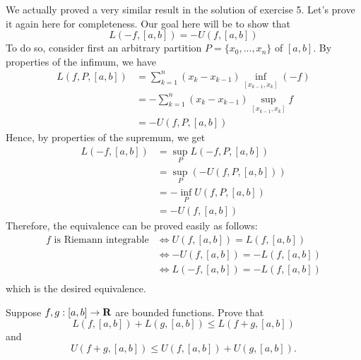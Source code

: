 \begin{solution}
    We actually proved a very similar result in the solution of exercise 5. Let's prove it again here for completeness. Our goal here will be to show that
    $$L(-f, [a,b]) = -U(f, [a,b])$$
    To do so, consider first an arbitrary partition $P = \{x_0, ..., x_n\}$ of $[a,b]$. By properties of the infimum, we have
    \begin{align*}
        L(f, P, [a,b]) &= \sum_{k=1}^{n}(x_k - x_{k-1})\inf_{[x_{k-1}, x_k]}(-f) \\
        &= -\sum_{k=1}^{n}(x_k - x_{k-1})\sup_{[x_{k-1}, x_k]}f \\
        &=-U(f, P, [a,b])
    \end{align*}
    Hence, by properties of the supremum, we get
    \begin{align*}
        L(-f, [a,b]) &= \sup_P L(-f, P, [a,b])\\
        &= \sup_P (- U(f, P, [a,b])) \\
        &= - \inf_P U(f, P, [a,b]) \\
        &= - U(f, [a,b])
    \end{align*}
    Therefore, the equivalence can be proved easily as follows:
    \begin{align*}
        f \text{ is Riemann integrable} &\iff U(f, [a,b]) = L(f, [a,b]) \\
        &\iff -U(f, [a,b]) = -L(f, [a,b]) \\
        &\iff L(-f, [a,b]) = -L(f, [a,b]) \\
    \end{align*}
    which is the desired equivalence.\\
\end{solution}

\begin{exercise}
    Suppose $f,g:[a,b] \to \mathbf{R}$ are bounded functions. Prove that 
    $$L(f, [a,b]) + L(g, [a,b]) \leq L(f+g, [a,b])$$
    and 
    $$U(f+g, [a,b]) \leq U(f, [a,b]) + U(g, [a,b]).$$
\end{exercise}

